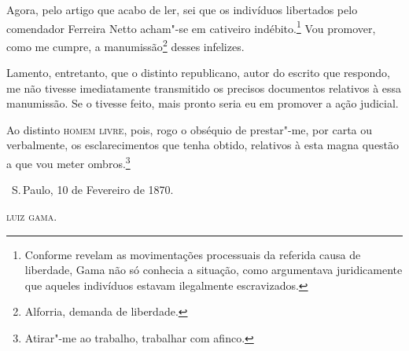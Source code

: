 Agora, pelo artigo que acabo de ler, sei que os indivíduos libertados
pelo comendador Ferreira Netto acham"-se em cativeiro indébito.\footnote{Conforme revelam as movimentações processuais da referida causa de
  liberdade, Gama não só conhecia a situação, como argumentava
  juridicamente que aqueles indivíduos estavam ilegalmente escravizados.}
Vou promover, como me cumpre, a manumissão\footnote{Alforria, demanda
  de liberdade.} desses infelizes.

Lamento, entretanto, que o distinto republicano, autor do escrito que
respondo, me não tivesse imediatamente transmitido os precisos
documentos relativos à essa manumissão. Se o tivesse feito, mais pronto
seria eu em promover a ação judicial.

Ao distinto \textsc{homem livre}, pois, rogo o obséquio de prestar"-me, por carta
ou verbalmente, os esclarecimentos que tenha obtido, relativos à esta
magna questão a que vou meter ombros.\footnote{Atirar"-me ao trabalho,
  trabalhar com afinco.}

\bigskip

\hfill\ S.\,Paulo, 10 de Fevereiro de 1870.\smallskip

\hfill\textsc{luiz gama}.

\paginabranca
\thispagestyle{empty}

